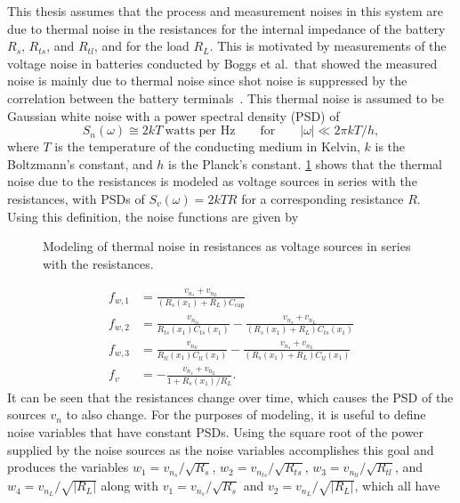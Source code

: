 \documentclass[../zhang_thesis.tex]{subfiles}
\begin{document}
This thesis assumes that the process and measurement noises in this system are due to thermal noise in the resistances for the internal impedance of the battery $R_s$, $R_{ts}$, and $R_{tl}$, and for the load $R_L$. This is motivated by measurements of the voltage noise in batteries conducted by Boggs et al.\ that showed the measured noise is mainly due to thermal noise since shot noise is suppressed by the correlation between the battery terminals~\cite{boggs95}. This thermal noise
is assumed to be Gaussian white noise with a power spectral density (PSD) of~\cite{stremler82}
\begin{equation}
    S_n(\omega) \cong 2kT\ \text{watts per Hz} \qquad \text{for} \qquad |\omega| \ll 2\pi kT/h,
\end{equation}
where $T$ is the temperature of the conducting medium in Kelvin, $k$ is the Boltzmann's constant, and $h$ is the Planck's constant. \cref{fig:batt_noisy} shows that the thermal noise due to the resistances is modeled as voltage sources in series with the resistances, with PSDs of $S_v(\omega)=2kTR$ for a corresponding resistance $R$. Using this definition, the noise functions are given by
\begin{figure}[b]
\centering
%
\caption{Modeling of thermal noise in resistances as voltage sources in series with the resistances.}
\label{fig:batt_noisy}
\end{figure}
\begin{align}
    f_{w,1} &= \frac{v_{n_s}+v_{n_L}}{(R_s(x_1)+R_L)C_\text{cap}} \\
    f_{w,2} &= \frac{v_{n_{ts}}}{R_{ts}(x_1)C_{ts}(x_1)} - \frac{v_{n_s}+v_{n_L}}{(R_s(x_1)+R_L)C_{ts}(x_1)} \\
    f_{w,3} &= \frac{v_{n_{tl}}}{R_{tl}(x_1)C_{tl}(x_1)} - \frac{v_{n_s}+v_{n_L}}{(R_s(x_1)+R_L)C_{tl}(x_1)} \\
    f_v &= - \frac{v_{n_s}+v_{n_L}}{1+R_s(x_1)/R_L}.
\end{align}
It can be seen that the resistances change over time, which causes the PSD of the sources $v_n$ to also change. For the purposes of modeling, it is useful to define noise variables that have constant PSDs. Using the square root of the power supplied by the noise sources as the noise variables accomplishes this goal and produces the variables $w_1=v_{n_s}/\sqrt{R_s}$, $w_2=v_{n_{ts}}/\sqrt{R_{ts}}$, $w_3=v_{n_{tl}}/\sqrt{R_{tl}}$, and $w_4=v_{n_L}/\sqrt{|R_L|}$ along with
$v_1=v_{n_s}/\sqrt{R_s}$ and $v_2=v_{n_L}/\sqrt{|R_L|}$, which all have
\end{document}
